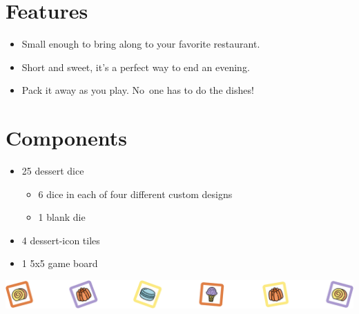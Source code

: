 \documentclass[a5paper, DIV=18, 12pt]{scrartcl}
\begin{document}
\flushleft
\vspace{-1ex}
\begin{multicols}{2}
\section*{\textcolor{ScrollYellow}{Features}}
%
%
\begin{itemize}[leftmargin=*, nosep]
\item Small enough to bring along to your favorite restaurant.
\vspace{1ex}
\item Short and sweet, it's a perfect way to end an evening.
\vspace{1ex}
\item Pack it away as you play. No~one has to do the dishes!
\end{itemize}

\vfill\null\columnbreak

\section*{\textcolor{JelloOrange}{Components}}
\begin{itemize}[leftmargin=*, nosep]
	\item 25 dessert dice
	\begin{itemize}[leftmargin=*, nosep]
		\vspace{0.4ex}
		\item 6 dice in each of four different custom designs 
		\vspace{0.5ex}
		\item 1 blank die
	\end{itemize}
	\vspace{0.5ex}
	\item 4 dessert-icon tiles
	\vspace{0.5ex}
	\item 1 5x5 game board
\end{itemize}
\end{multicols}
\vspace{-4ex}
\begin{center}
\includegraphics[width=\textwidth]{Images/dice_separator.png}
\end{center}
\end{document}
